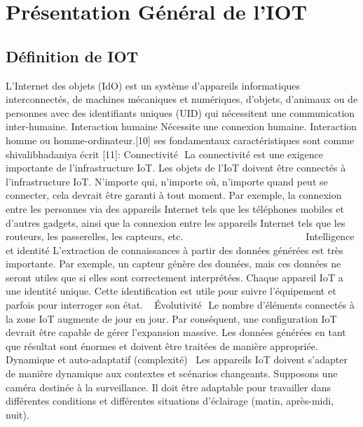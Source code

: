\chapter{Présentation Général de l’IOT} \label{chap:Présentation général de l’IOT}
\section{Définition de IOT}
L'Internet des objets (IdO) est un système d'appareils informatiques interconnectés, de machines mécaniques et numériques, d'objets, d'animaux ou de personnes avec des identifiants uniques (UID) qui nécessitent une communication inter-humaine. Interaction humaine Nécessite une connexion humaine. Interaction homme ou homme-ordinateur.[10] ses fondamentaux caractéristiques sont comme shivalibhadaniya écrit  [11]: \newline
Connectivité \newline La connectivité est une exigence importante de l’infrastructure IoT. Les objets de l’IoT doivent être connectés à l’infrastructure IoT. N’importe qui, n’importe où, n’importe quand peut se connecter, cela devrait être garanti à tout moment. Par exemple, la connexion entre les personnes via des appareils Internet tels que les téléphones mobiles et d’autres gadgets, ainsi que la connexion entre les appareils Internet tels que les routeurs, les passerelles, les capteurs, etc.  \newline                            
Intelligence et identité \newline
L’extraction de connaissances à partir des données générées est très importante. Par exemple, un capteur génère des données, mais ces données ne seront utiles que si elles sont correctement interprétées. Chaque appareil IoT a une identité unique. Cette identification est utile pour suivre l’équipement et parfois pour interroger son état.\newline  
Évolutivité \newline Le nombre d’éléments connectés à la zone IoT augmente de jour en jour. Par conséquent, une configuration IoT devrait être capable de gérer l’expansion massive. Les données générées en tant que résultat sont énormes et doivent être traitées de manière appropriée.\newline  
Dynamique et auto-adaptatif (complexité) \newline
 Les appareils IoT doivent s’adapter de manière dynamique aux contextes et scénarios changeants. Supposons une caméra destinée à la surveillance. Il doit être adaptable pour travailler dans différentes conditions et différentes situations d’éclairage (matin, après-midi, nuit).\newline  
